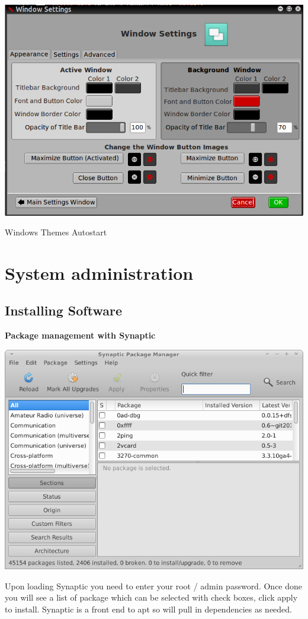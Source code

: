 \documentclass[12pt,a4paper]{book}
\begin{document}
\begin{center}
\includegraphics[width=0.7\linewidth]{window-settings}
\end{center}


{Windows}
{Themes}
{Autostart}


\newpage

\chapter{System administration}
\section{Installing Software}
\textbf{Package management with Synaptic}
\label{synaptic}

\includegraphics[width=0.8\linewidth]{screen-shots/synaptic1}

Upon loading Synaptic you need to enter your root / admin password.  Once done you will see a list of package which can be selected
with check boxes, click apply to install.  Synaptic is a front end to apt so will pull in dependencies as needed. 
\end{document}

